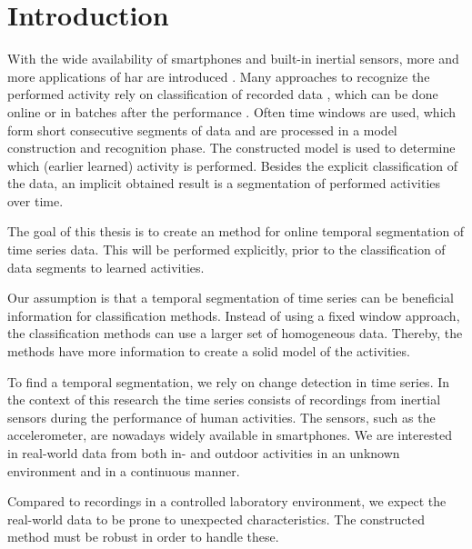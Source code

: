 \chapter{Introduction}

\label{Chapter1} %


With the wide availability of smartphones and built-in inertial sensors, more and more applications of \gls{har} are introduced \cite{avci2010activity,derawi2010accelerometer,guenterberg2009distributed}.
Many approaches to recognize the performed activity rely on classification of recorded data \cite{devaul2001real,ward2006activity,yang2008using,anguita2012human,bao2004activity,bernecker2012activity,he2008activity}, which can be done online or in batches after the performance \cite{duque2012offline}.
Often time windows are used, which form short consecutive segments of data and are processed in a model construction and recognition phase.
The constructed model is used to determine which (earlier learned) activity is performed.
Besides the explicit classification of the data, an implicit obtained result is a segmentation of performed activities over time.

The goal of this thesis is to create an method for online temporal segmentation of time series data.
This will be performed explicitly, prior to the classification of data segments to learned activities.

Our assumption is that a temporal segmentation of time series can be beneficial information for classification methods.
Instead of using a fixed window approach, the classification methods can use a larger set of homogeneous data.
Thereby, the methods have more information to create a solid model of the activities.

To find a temporal segmentation, we rely on change detection in time series.
In the context of this research the time series consists of recordings from inertial sensors during the performance of human activities.
The sensors, such as the accelerometer, are nowadays widely available in smartphones.
We are interested in real-world data from both in- and outdoor activities in an unknown environment and in a continuous manner.

Compared to recordings in a controlled laboratory environment, we expect the real-world data to be prone to unexpected characteristics.
The constructed method must be robust in order to handle these.

